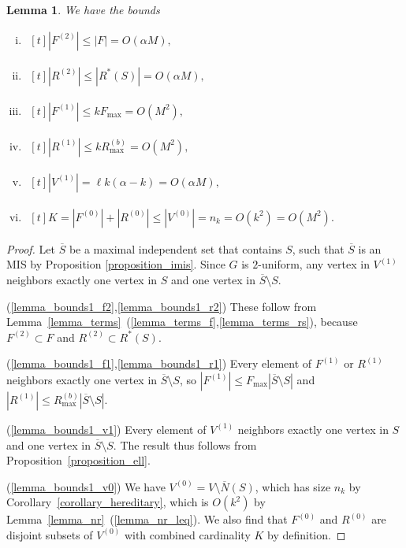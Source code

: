 \documentclass{article}
\theoremstyle{plain}
\theoremstyle{remark}
\theoremstyle{plain}
\newtheorem{lemma}[theorem]{Lemma}
\numberwithin{equation}{section}
\begin{document}
	\begin{lemma}\label{lemma_bounds1}
		We have the bounds
		\begin{enumerate}[(i)]
			\item\label{lemma_bounds1_f2} $\begin{aligned}[t]
				|F^{(2)}|\leq|F|=O(\alpha M),
			\end{aligned}$
			\item\label{lemma_bounds1_r2} $\begin{aligned}[t]
				|R^{(2)}|\leq|R^*(S)|=O(\alpha M),
			\end{aligned}$
			\item\label{lemma_bounds1_f1} $\begin{aligned}[t]
				|F^{(1)}|\leq kF_{\max}=O(M^2),
			\end{aligned}$
			\item\label{lemma_bounds1_r1} $\begin{aligned}[t]
				|R^{(1)}|\leq kR^{(b)}_{\max}=O(M^2),
			\end{aligned}$
			\item\label{lemma_bounds1_v1} $\begin{aligned}[t]
				|V^{(1)}|=\ell k(\alpha-k)=O(\alpha M),
			\end{aligned}$
			\item\label{lemma_bounds1_v0} $\begin{aligned}[t]
				K=|F^{(0)}|+|R^{(0)}|\leq|V^{(0)}|=n_k=O(k^2)=O(M^2).
			\end{aligned}$
		\end{enumerate}
	\end{lemma}
	
	\begin{proof}
		Let $\overline{S}$ be a maximal independent set that contains $S$, such that $\overline{S}$ is an MIS by Proposition \ref{proposition_imis}. Since $G$ is $2$-uniform, any vertex in $V^{(1)}$ neighbors exactly one vertex in $S$ and one vertex in $\overline{S}\setminus S$.
		
		(\ref{lemma_bounds1_f2},\ref{lemma_bounds1_r2}) These follow from Lemma~\ref{lemma_terms}~(\ref{lemma_terms_f},\ref{lemma_terms_rs}), because $F^{(2)}\subset F$ and $R^{(2)}\subset R^*(S)$.
		
		(\ref{lemma_bounds1_f1},\ref{lemma_bounds1_r1}) Every element of $F^{(1)}$ or $R^{(1)}$ neighbors exactly one vertex in $\overline{S}\setminus S$, so $|F^{(1)}|\leq F_{\max}|\overline{S}\setminus S|$ and $|R^{(1)}|\leq R^{(b)}_{\max}|\overline{S}\setminus S|$.
		
		(\ref{lemma_bounds1_v1}) Every element of $V^{(1)}$ neighbors exactly one vertex in $S$ and one vertex in $\overline{S}\setminus S$. The result thus follows from Proposition~\ref{proposition_ell}.
		
		(\ref{lemma_bounds1_v0}) We have $V^{(0)}=V\setminus\overline{N}(S)$, which has size $n_k$ by Corollary~\ref{corollary_hereditary}, which is $O(k^2)$ by Lemma~\ref{lemma_nr}~(\ref{lemma_nr_leq}). We also find that $F^{(0)}$ and $R^{(0)}$ are disjoint subsets of $V^{(0)}$ with combined cardinality $K$ by definition.
	\end{proof}
	
\end{document}
